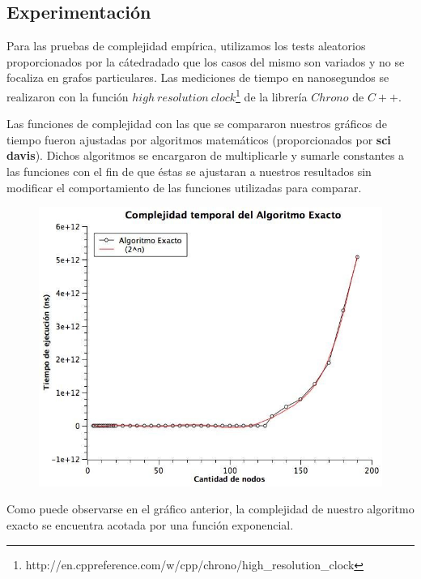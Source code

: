 \subsection{Experimentación}

Para las pruebas de complejidad empírica, utilizamos los tests aleatorios proporcionados por la cátedradado que los casos del mismo son variados y no se focaliza en grafos particulares. Las mediciones de tiempo en nanosegundos se realizaron con la función $high\ resolution\ clock$\footnote{http://en.cppreference.com/w/cpp/chrono/high\_resolution\_clock} de la librería $Chrono$ de $C++$. 

Las funciones de complejidad con las que se compararon nuestros gráficos de tiempo fueron ajustadas por algoritmos matemáticos (proporcionados por \textbf{sci davis}). Dichos algoritmos se encargaron de multiplicarle y sumarle constantes a las funciones con el fin de que éstas se ajustaran a nuestros resultados sin modificar el comportamiento de las funciones utilizadas para comparar.
	
\begin{figure}[H] %
\begin{center}
\includegraphics[width=350pt]{../imgs/exactoComplejidad.jpg}
\end{center}
\end{figure}

Como puede observarse en el gráfico anterior, la complejidad de nuestro algoritmo exacto se encuentra acotada por una función exponencial.